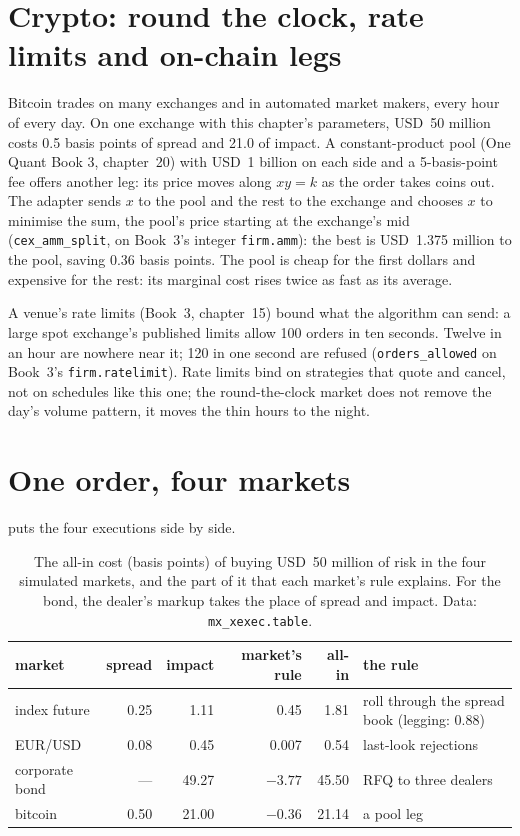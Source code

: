 \section{Crypto: round the clock, rate limits and on-chain legs}

Bitcoin trades on many exchanges and in automated market makers, every hour of every day. On one exchange with this chapter's parameters, USD~50
million costs 0.5 basis points of spread and 21.0 of impact. A constant-product pool (One Quant Book 3, chapter~20) with USD~1 billion on each side and
a 5-basis-point fee offers another leg: its price moves along $xy=k$ as the order takes coins out. The adapter sends $x$ to the pool and the rest to
the exchange and chooses $x$ to minimise the sum, the pool's price starting at the exchange's mid (\texttt{cex\_amm\_split}, on Book~3's integer
\texttt{firm.amm}): the best is USD~1.375 million to the pool, saving 0.36 basis points. The pool is cheap for the first dollars and expensive for
the rest: its marginal cost rises twice as fast as its average.

A venue's rate limits (Book~3, chapter~15) bound what the algorithm can send: a large spot exchange's published limits allow 100 orders in ten
seconds. Twelve  in an hour are nowhere near it; 120 in one second are refused (\texttt{orders\_allowed} on Book~3's
\texttt{firm.ratelimit}). Rate limits bind on strategies that quote and cancel, not on schedules like this one; the round-the-clock market does not
remove the day's volume pattern, it moves the thin hours to the night.

\section{One order, four markets}

 puts the four executions side by side.

\begin{table}[ht]
\centering
\small
\begin{tabular}{@{}lrrrrl@{}}
\toprule
market & spread & impact & market's rule & all-in & the rule \\
\midrule
index future & 0.25 & 1.11 & 0.45 & 1.81 & roll through the spread book (legging: 0.88) \\
EUR/USD & 0.08 & 0.45 & 0.007 & 0.54 & last-look rejections \\
corporate bond & --- & 49.27 & $-3.77$ & 45.50 & RFQ to three dealers \\
bitcoin & 0.50 & 21.00 & $-0.36$ & 21.14 & a pool leg \\
\bottomrule
\end{tabular}
\caption{The all-in cost (basis points) of buying USD~50 million of risk in the four simulated markets, and the part of it that each market's rule
explains. For the bond, the dealer's markup takes the place of spread and impact. Data: \texttt{mx\_xexec.table}.}\label{tab:mx:execution-beyond-equities:allin}
\end{table}

